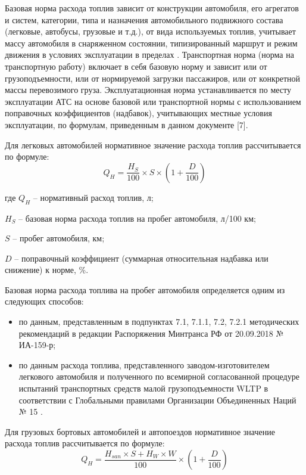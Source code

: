\documentclass[../nirs.tex]{subfiles}
\begin{document}
Базовая норма расхода топлив зависит от конструкции автомобиля, его агрегатов и
систем, категории, типа и назначения автомобильного подвижного состава
(легковые, автобусы, грузовые и т.д.), от вида используемых топлив, учитывает
массу автомобиля в снаряженном состоянии, типизированный маршрут и режим
движения в условиях эксплуатации в пределах .
Транспортная норма (норма на транспортную работу) включает в себя базовую норму
и зависит или от грузоподъемности, или от нормируемой загрузки пассажиров, или
от конкретной массы перевозимого груза. Эксплуатационная норма устанавливается
по месту эксплуатации АТС на основе базовой или транспортной нормы с
использованием поправочных коэффициентов (надбавок), учитывающих местные условия
эксплуатации, по формулам, приведенным в данном документе [7].

Для легковых автомобилей нормативное значение расхода топлив рассчитывается по
формуле:
\begin{equation}
	Q_H = \frac{H_S}{100} \times S \times \left(1 + \frac{D}{100}\right)
\end{equation}

где $Q_H$ -- нормативный расход топлив, л;

$H_S$ -- базовая норма расхода топлив на пробег автомобиля, л/100 км;

$S$ -- пробег автомобиля, км;

$D$ -- поправочный коэффициент (суммарная относительная надбавка или снижение) к
норме, \%.

Базовая норма расхода топлива на пробег автомобиля определяется одним из
следующих способов:
\begin{itemize}
	\item по данным, представленным в подпунктах 7.1, 7.1.1, 7.2, 7.2.1
		методических рекомендаций  в редакции Распоряжения
		Минтранса РФ от 20.09.2018 № ИА-159-р;
	\item по данным расхода топлива, представленного заводом-изготовителем
		легкового автомобиля и полученного по всемирной согласованной процедуре
		испытаний транспортных средств малой грузоподъемности WLTP в
		соответствии с Глобальными правилами Организации Объединенных Наций № 15
		.
\end{itemize}


Для грузовых бортовых автомобилей и автопоездов нормативное значение расхода
топлив рассчитывается по формуле:
\begin{equation}
	Q_H = \frac{H_{san} \times S + H_W \times W}{100} \times \left(1 +
	\frac{D}{100}\right)
\end{equation}
 
\end{document}
